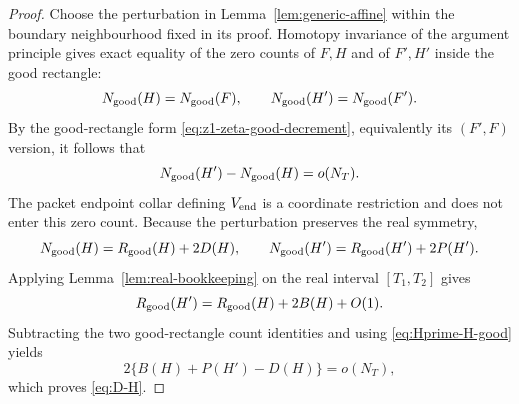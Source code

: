 \begin{proof}
Choose the perturbation in Lemma~\ref{lem:generic-affine} within the boundary
neighbourhood fixed in its proof. Homotopy invariance of the argument principle
gives exact equality of the zero counts of $F,H$ and of $F',H'$ inside the good
rectangle:
\[
N_{\rm good}(H)=N_{\rm good}(F),
\qquad
N_{\rm good}(H')=N_{\rm good}(F').
\]
By the good-rectangle form \eqref{eq:z1-zeta-good-decrement}, equivalently its
$(F',F)$ version, it follows that
\begin{equation}
N_{\rm good}(H')-N_{\rm good}(H)=o(N_T).
\label{eq:Hprime-H-good}
\end{equation}
The packet endpoint collar defining $V_{\rm end}$ is a coordinate restriction
and does not enter this zero count. Because the perturbation preserves the real
symmetry,
\[
N_{\rm good}(H)=R_{\rm good}(H)+2D(H),
\qquad
N_{\rm good}(H')=R_{\rm good}(H')+2P(H').
\]
Applying Lemma~\ref{lem:real-bookkeeping} on the real interval $[T_1,T_2]$ gives
\[
R_{\rm good}(H')=R_{\rm good}(H)+2B(H)+O(1).
\]
Subtracting the two good-rectangle count identities and using
\eqref{eq:Hprime-H-good} yields
\[
2\{B(H)+P(H')-D(H)\}=o(N_T),
\]
which proves \eqref{eq:D-H}.
\end{proof}

